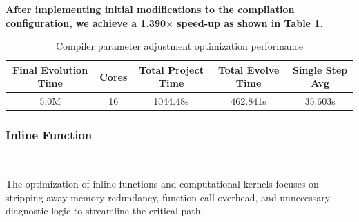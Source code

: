 \textbf{After implementing initial modifications to the compilation configuration, we achieve a 1.390$\times$ speed-up as shown in Table \ref{tab:amss parameter performance}.}

\begin{table}[h]
    \centering
    \small %
    \caption{Compiler parameter adjustment optimization performance}
    \label{tab:amss parameter performance}
    \begin{tabular}{|c|c|c|c|c|}
        \hline
        \textbf{Final Evolution Time }& \textbf{Cores} & \textbf{Total Project Time} &\textbf{Total Evolve Time} & \textbf{Single Step Avg} \\ \hline
        5.0M & 16 & 1044.48s &462.841s& 35.603s\\ \hline
    \end{tabular}
\end{table}

\subsubsection{Inline Function}
\ 



The optimization of inline functions and computational kernels focuses on stripping away memory redundancy, function call overhead, and unnecessary diagnostic logic to streamline the critical path:

